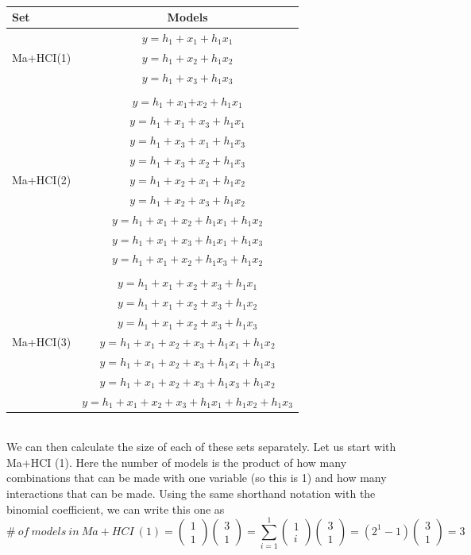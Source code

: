 \begin{table}
\caption{}
\begin{tabular}{lc}  
\toprule
Set & Models \\
\midrule
\multirow{3}{*}{Ma+HCI(1)} & $y=h_1+x_1+h_1x_1$\\ & $y=h_1+x_2+h_1x_2$\\ & $y=h_1+x_3+h_1x_3$\\ & \\ 
\multirow{9}{*}{Ma+HCI(2)} & $y=h_1+x_1$$+x_2+h_1x_1$\\ & $y=h_1+x_1+x_3+h_1x_1$\\ & $y=h_1+x_3+x_1+h_1x_3$\\ & $y=h_1+x_3+x_2+h_1x_3$\\ & $y=h_1+x_2+x_1+h_1x_2$\\ & $y=h_1+x_2+x_3+h_1x_2$\\ & $y=h_1+x_1+x_2+h_1x_1+h_1x_2$\\ & $y=h_1+x_1+x_3+h_1x_1+h_1x_3$\\ & $y=h_1+x_1+x_2+h_1x_3+h_1x_2$\\  & \\  
\multirow{7}{*}{Ma+HCI(3)} & $y=h_1+x_1+x_2+x_3+h_1x_1$\\ & $y=h_1+x_1+x_2+x_3+h_1x_2$\\ & $y=h_1+x_1+x_2+x_3+h_1x_3$\\ & $y=h_1+x_1+x_2+x_3+h_1x_1+h_1x_2$\\ & $y=h_1+x_1+x_2+x_3+h_1x_1+h_1x_3$\\ & $y=h_1+x_1+x_2+x_3+h_1x_3+h_1x_2$\\ & $y=h_1+x_1+x_2+x_3+h_1x_1+h_1x_2+h_1x_3$\\  
\bottomrule
\end{tabular}
\end{table}
\\

We can then calculate the size of each of these sets separately. Let us start with Ma+HCI (1). Here the number of models is the product of how many combinations that can be made with one variable (so this is 1) and how many interactions that can be made. Using the same shorthand notation with the binomial coefficient, we can write this one as
\[\#\ of\ models\ in\ Ma+HCI\ \left(1\right)=\left( \begin{array}{c}
1 \\ 
1 \end{array}
\right)\left( \begin{array}{c}
3 \\ 
1 \end{array}
\right)=\sum^1_{i=1}{\left( \begin{array}{c}
1 \\ 
i \end{array}
\right)}\left( \begin{array}{c}
3 \\ 
1 \end{array}
\right)=\left(2^1-1\right)\left( \begin{array}{c}
3 \\ 
1 \end{array}
\right)=3\] 

